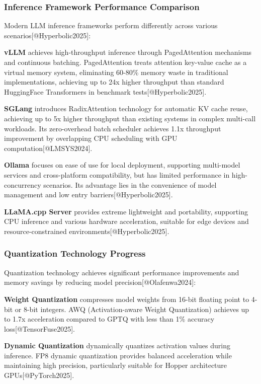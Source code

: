 \documentclass{article}
\begin{document}
\subsubsection{Inference Framework Performance Comparison}
Modern LLM inference frameworks perform differently across various scenarios[@Hyperbolic2025]:

\textbf{vLLM} achieves high-throughput inference through PagedAttention mechanisms and continuous batching. PagedAttention treats attention key-value cache as a virtual memory system, eliminating 60-80\% memory waste in traditional implementations, achieving up to 24x higher throughput than standard HuggingFace Transformers in benchmark tests[@Hyperbolic2025].

\textbf{SGLang} introduces RadixAttention technology for automatic KV cache reuse, achieving up to 5x higher throughput than existing systems in complex multi-call workloads. Its zero-overhead batch scheduler achieves 1.1x throughput improvement by overlapping CPU scheduling with GPU computation[@LMSYS2024].

\textbf{Ollama} focuses on ease of use for local deployment, supporting multi-model services and cross-platform compatibility, but has limited performance in high-concurrency scenarios. Its advantage lies in the convenience of model management and low entry barriers[@Hyperbolic2025].

\textbf{LLaMA.cpp Server} provides extreme lightweight and portability, supporting CPU inference and various hardware acceleration, suitable for edge devices and resource-constrained environments[@Hyperbolic2025].

\subsubsection{Quantization Technology Progress}
Quantization technology achieves significant performance improvements and memory savings by reducing model precision[@Olafenwa2024]:

\textbf{Weight Quantization} compresses model weights from 16-bit floating point to 4-bit or 8-bit integers. AWQ (Activation-aware Weight Quantization) achieves up to 1.7x acceleration compared to GPTQ with less than 1\% accuracy loss[@TensorFuse2025].

\textbf{Dynamic Quantization} dynamically quantizes activation values during inference. FP8 dynamic quantization provides balanced acceleration while maintaining high precision, particularly suitable for Hopper architecture GPUs[@PyTorch2025].
\end{document}
